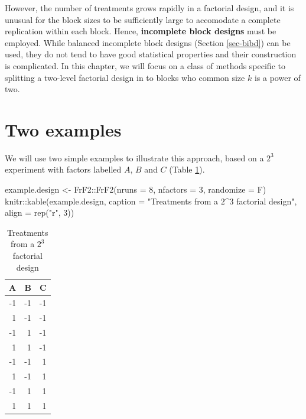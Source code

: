 \documentclass[
]{book}
\newenvironment{Shaded}{\begin{snugshade}}{\end{snugshade}}
\newcommand{\AttributeTok}[1]{\textcolor[rgb]{0.77,0.63,0.00}{#1}}
\newcommand{\DecValTok}[1]{\textcolor[rgb]{0.00,0.00,0.81}{#1}}
\newcommand{\FunctionTok}[1]{\textcolor[rgb]{0.00,0.00,0.00}{#1}}
\newcommand{\NormalTok}[1]{#1}
\newcommand{\OtherTok}[1]{\textcolor[rgb]{0.56,0.35,0.01}{#1}}
\newcommand{\SpecialCharTok}[1]{\textcolor[rgb]{0.00,0.00,0.00}{#1}}
\newcommand{\StringTok}[1]{\textcolor[rgb]{0.31,0.60,0.02}{#1}}
\theoremstyle{definition}
\theoremstyle{definition}
\theoremstyle{definition}
\theoremstyle{definition}
\theoremstyle{remark}
\begin{document}
However, the number of treatments grows rapidly in a factorial design, and it is unusual for the block sizes to be sufficiently large to accomodate a complete replication within each block. Hence, \textbf{incomplete block designs} must be employed. While balanced incomplete block designs (Section \ref{sec-bibd}) can be used, they do not tend to have good statistical properties and their construction is complicated. In this chapter, we will focus on a class of methods specific to splitting a two-level factorial design in to blocks who common size \(k\) is a power of two.

\hypertarget{two-examples}{%
\section{Two examples}\label{two-examples}}

We will use two simple examples to illustrate this approach, based on a \(2^3\) experiment with factors labelled \(A\), \(B\) and \(C\) (Table \ref{tab:example-factorial}).

\begin{Shaded}
\begin{Highlighting}[]
\NormalTok{example.design }\OtherTok{\textless{}{-}}\NormalTok{ FrF2}\SpecialCharTok{::}\FunctionTok{FrF2}\NormalTok{(}\AttributeTok{nruns =} \DecValTok{8}\NormalTok{, }\AttributeTok{nfactors =} \DecValTok{3}\NormalTok{, }\AttributeTok{randomize =}\NormalTok{ F)}
\NormalTok{knitr}\SpecialCharTok{::}\FunctionTok{kable}\NormalTok{(example.design, }\AttributeTok{caption =} \StringTok{"Treatments from a $2\^{}3$ factorial design"}\NormalTok{, }\AttributeTok{align =} \FunctionTok{rep}\NormalTok{(}\StringTok{"r"}\NormalTok{, }\DecValTok{3}\NormalTok{))}
\end{Highlighting}
\end{Shaded}

\begin{table}

\caption{\label{tab:example-factorial}Treatments from a $2^3$ factorial design}
\centering
\begin{tabular}[t]{r|r|r}
\hline
A & B & C\\
\hline
-1 & -1 & -1\\
\hline
1 & -1 & -1\\
\hline
-1 & 1 & -1\\
\hline
1 & 1 & -1\\
\hline
-1 & -1 & 1\\
\hline
1 & -1 & 1\\
\hline
-1 & 1 & 1\\
\hline
1 & 1 & 1\\
\hline
\end{tabular}
\end{table}
\end{document}
